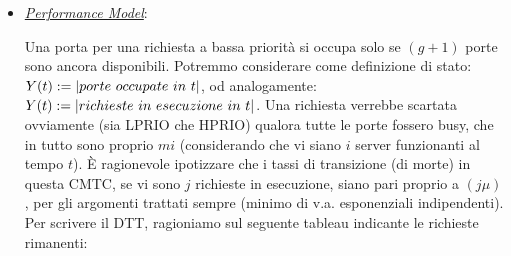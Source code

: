 \begin{itemize}
Calcoliamo ora i tassi di transizione:

\[
	\tau_{i',i'+1} = \frac{q_{i',i'+1}}{-q_{i'i'}} = \Pr\{\xi_{Rt}<\eta_{Rt}\} = \int_0^\infty{\Pr\{\xi_{Rt}<\eta_{Rt}\ |\ \eta_{Rt}=y\}\Pr\{\eta_{Rt}=y\}dy} =
\]
\[
	= \int_0^\infty{(1-\e^{-\beta y})(M-i)f\e^{-(M-i)fy}dy} =
\]
\[
	= \int_0^\infty{(M-i)f\e^{-(M-i)fy}dy}-(M-i)f\int_0^\infty{\e^{-[\beta+(M-i)f]y}dy} =
\]
\[
	= 1-\frac{(M-i)f}{\beta+(M-i)f} = \frac{\beta+(M-i)f-(M-i)f}{\beta+(M-i)f} \implies q_{i',i'+1} = \beta
\]

Analogamente..

\[
	\tau_{i',i'-1} = \frac{q_{i',i'-1}}{-q_{i'i'}} = \Pr\{\eta_{Rt}<\xi_{Rt}\} = \int_0^\infty{\Pr\{\eta_{Rt}<\xi_{Rt}\ |\ \xi_{Rt}=y\}\Pr\{\xi_{Rt}=y\}dy} =
\]
\[
	= \int_0^\infty{(1-\e^{-(M-i)fy})\beta\e^{-\beta y}dy} = \int_0^\infty{\beta\e^{-\beta y}dy}-\beta\int_0^\infty{\e^{-[(M-i)f+\beta]y}dy} =
\]
\[
	= 1-\frac{\beta}{(M-i)f+\beta} = \frac{(M-i)f+\beta-\beta}{(M-i)f+\beta} = \frac{(M-i)f}{(M-i)f+\beta} \implies q_{i',i'-1}=(M-i)f
\]

Per quanto concerne le probabilità a regime abbiamo:

\[
	\left\{
	\begin{aligned}
	&\pi_i=\pi_0(\frac{\beta}{f})^i \frac{1}{i!}\\
	&[\pi_0=\frac{1}{\sum_{i=0}^M{(\frac{\beta}{f})^i \frac{1}{i!}}}
	\end{aligned}
	\right.
\]

con $0\leq i\leq M$. La formula è già stata vista in realtà nella M/M/m/0, ovvero la B di ERLANG.

\item{\underline{\textit{Performance Model}}}:

Una porta per una richiesta a bassa priorità si occupa solo se $(g+1)$ porte sono ancora disponibili. Potremmo considerare come definizione di stato: $Y(t):=\cardinality{porte\ occupate\ in\ t}$, od analogamente: $Y(t):=\cardinality{richieste\ in\ esecuzione\ in\ t}$. Una richiesta verrebbe scartata ovviamente (sia LPRIO che HPRIO) qualora tutte le porte fossero busy, che in tutto sono proprio $mi$ (considerando che vi siano $i$ server funzionanti al tempo $t$). \`E ragionevole ipotizzare che i tassi di transizione (di morte) in questa CMTC, se vi sono $j$ richieste in esecuzione, siano pari proprio a $(j\mu)$, per gli argomenti trattati sempre (minimo di v.a. esponenziali indipendenti). Per scrivere il DTT, ragioniamo sul seguente tableau indicante le richieste rimanenti:


\end{itemize}
